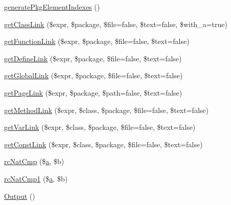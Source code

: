\begin{DoxyCompactItemize}
\item 
\hyperlink{class_h_t_m_l_smarty_converter_a147e3da92be9273af6ea18e5a20beeaa}{generate\-Pkg\-Element\-Indexes} ()
\item 
\hyperlink{class_h_t_m_l_smarty_converter_a8b3bb3ebb1cf7b7a31ef71cbe4dcca9e}{get\-Class\-Link} (\$expr, \$package, \$file=false, \$text=false, \$with\-\_\-a=true)
\item 
\hyperlink{class_h_t_m_l_smarty_converter_ab5f43d9a50aae936411c84a680e9c186}{get\-Function\-Link} (\$expr, \$package, \$file=false, \$text=false)
\item 
\hyperlink{class_h_t_m_l_smarty_converter_a17086c17d82323b3e929d24ad6da092d}{get\-Define\-Link} (\$expr, \$package, \$file=false, \$text=false)
\item 
\hyperlink{class_h_t_m_l_smarty_converter_afef6bfb2b26aac19e52a1d153d4bae4b}{get\-Global\-Link} (\$expr, \$package, \$file=false, \$text=false)
\item 
\hyperlink{class_h_t_m_l_smarty_converter_aad8f419498310968275cbd3658e75c90}{get\-Page\-Link} (\$expr, \$package, \$path=false, \$text=false)
\item 
\hyperlink{class_h_t_m_l_smarty_converter_a23ab6aa7d92e8ca1cb398a8201d0bd61}{get\-Method\-Link} (\$expr, \$class, \$package, \$file=false, \$text=false)
\item 
\hyperlink{class_h_t_m_l_smarty_converter_a5a0a06a811d1135f4a05c79fb74909db}{get\-Var\-Link} (\$expr, \$class, \$package, \$file=false, \$text=false)
\item 
\hyperlink{class_h_t_m_l_smarty_converter_ad028169d32b0a0293c8bf2fbbff60594}{get\-Const\-Link} (\$expr, \$class, \$package, \$file=false, \$text=false)
\item 
\hyperlink{class_h_t_m_l_smarty_converter_a669301a557a996bf338badc5ca253156}{rc\-Nat\-Cmp} (\$\hyperlink{classa}{a}, \$b)
\item 
\hyperlink{class_h_t_m_l_smarty_converter_ac75bdbfec92cd3025b5bdb5f60e14970}{rc\-Nat\-Cmp1} (\$\hyperlink{classa}{a}, \$b)
\item 
\hyperlink{class_h_t_m_l_smarty_converter_a356172c336fe8c0afbac8c49d5dcc703}{\-Output} ()
\end{DoxyCompactItemize}

